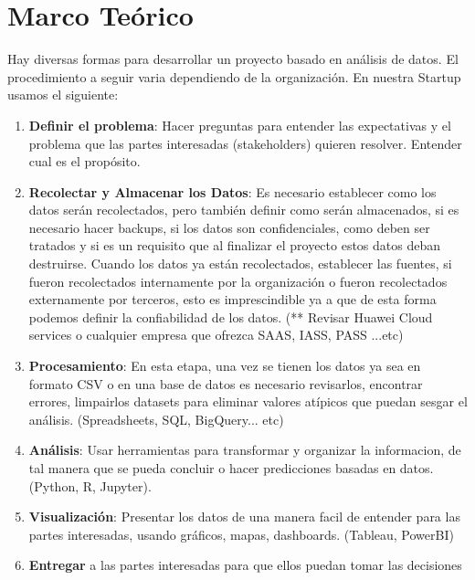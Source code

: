 \documentclass[12pt,a4paper,openright]{article}
\begin{document}
\section{Marco Te\'orico}
Hay diversas formas para desarrollar un proyecto basado en an\'alisis de datos. El procedimiento a seguir varia dependiendo de la organizaci\'on. En nuestra Startup usamos el siguiente:

\begin{enumerate}
    \item \textbf{Definir el problema}: Hacer preguntas para entender las expectativas y el problema que las partes interesadas (stakeholders) quieren resolver. Entender cual es el propósito.
    \item \textbf{Recolectar y Almacenar los Datos}: Es necesario establecer como los datos serán recolectados, pero también definir como serán almacenados, si es necesario hacer backups, si los datos son confidenciales, como deben ser tratados y si es un requisito que al finalizar el proyecto estos datos deban destruirse. Cuando los datos ya están recolectados, establecer las fuentes, si fueron recolectados internamente por la organización o fueron recolectados externamente por terceros, esto es imprescindible ya a que de esta forma podemos definir la confiabilidad de los datos. (** Revisar Huawei Cloud services o cualquier empresa que ofrezca SAAS, IASS, PASS ...etc)
    \item \textbf{Procesamiento}: En esta etapa, una vez se tienen los datos ya sea en formato CSV o en una base de datos es necesario revisarlos, encontrar errores, limpairlos datasets para eliminar valores atípicos que puedan sesgar el análisis. (Spreadsheets, SQL, BigQuery... etc)
    \item \textbf{An\'alisis}: Usar herramientas para transformar y organizar la informacion, de tal manera que se pueda concluir o hacer predicciones basadas en datos. (Python, R, Jupyter).
    \item \textbf{Visualización}: Presentar los datos de una manera facil de entender para las partes interesadas, usando gráficos, mapas, dashboards. (Tableau, PowerBI)
    \item \textbf{Entregar} a las partes interesadas para que ellos puedan tomar las decisiones
\end{enumerate}
\end{document}
